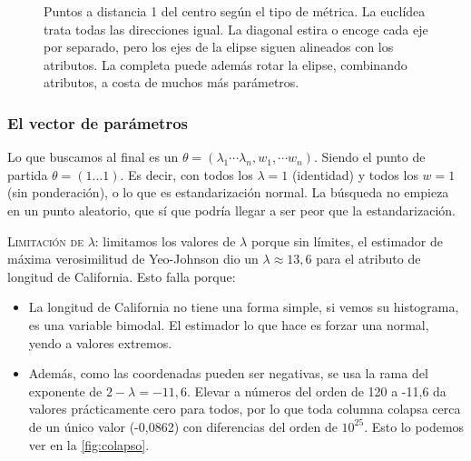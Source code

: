 \begin{figure}[htbp]
\centering
{}
\caption{Puntos a distancia 1 del centro según el tipo de métrica. La euclídea
trata todas las direcciones igual. La diagonal estira o encoge cada eje por
separado, pero los ejes de la elipse siguen alineados con los atributos. La
completa puede además rotar la elipse, combinando atributos, a costa de muchos
más parámetros.}
\label{fig:mahalanobis}
\end{figure}

\subsubsection{El vector de parámetros}
Lo que buscamos al final es un $\theta = (\lambda_{1}\cdots \lambda_{n}, w_{1}, \cdots w_{n})$. Siendo el punto de partida $\theta=(1...1)$. Es decir, con todos los $\lambda=1$ (identidad) y todos los $w=1$(sin ponderación), o lo que es estandarización normal. La búsqueda no empieza en un punto aleatorio, que sí que podría llegar a ser peor que la estandarización. 

\textsc{Limitación de $\lambda$}: limitamos los valores de $\lambda$ porque sin límites, el estimador de máxima verosimilitud de Yeo-Johnson dio un $\lambda\approx 13,6$ para el atributo de longitud de California. Esto falla porque: 
\begin{itemize}
    \item La longitud de California no tiene una forma simple, si vemos su histograma, es una variable bimodal. El estimador lo que hace es forzar una normal, yendo a valores extremos. 
    \item Además, como las coordenadas pueden ser negativas, se usa la rama del exponente de $2-\lambda=-11,6$. Elevar a números del orden de 120 a -11,6 da valores prácticamente cero para todos, por lo que toda columna colapsa cerca de un único valor (-0,0862) con diferencias del orden de $10^{25}$. Esto lo podemos ver en la \autoref{fig:colapso}.
\end{itemize}

